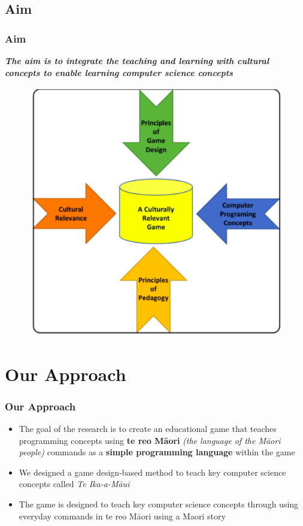 \documentclass[aspectratio=169]{beamer}
\begin{document}
\subsection{Aim}
\begin{frame}
\frametitle{Aim}
\textit{\textbf{The aim is to integrate the teaching and learning with cultural concepts to enable learning computer science concepts}} 
\begin{figure}
\includegraphics[scale=0.24]{p1.png}
\end{figure}
\end{frame}

\section{Our Approach}
\begin{frame}
\frametitle{Our Approach}
\begin{itemize}
\item The goal of the research is to create an educational game that teaches programming concepts using \textbf{te reo M\=aori} \textit{(the language of the M\=aori people)} commands  as a \textbf{simple programming language} within the game
\newline
\item We designed a game design-based method to teach key computer science concepts called \textit{Te Ika-a-Māui}
\newline	
\item The game is designed to teach key computer science concepts through using everyday commands in te reo M\=aori using a Maori story 
	
\end{itemize}
\end{frame}
\end{document}

